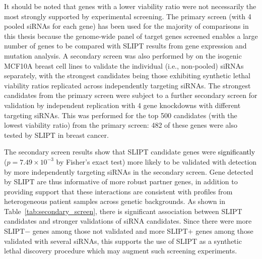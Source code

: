 It should be noted that genes with a lower viability ratio were not necessarily the most strongly supported by experimental screening. The primary screen (with 4 pooled \glspl{siRNA} for each gene) has been used for the majority of comparisons in this thesis because the \gls{genome}-wide panel of target genes screened enables a large number of genes to be compared with \gls{SLIPT} results from \gls{gene expression} and  \gls{mutation} analysis. A secondary screen was also performed by \citet{Telford2015} on the isogenic MCF10A breast cell lines to validate the individual (i.e., non-pooled) \glspl{siRNA} separately, with the strongest candidates being those exhibiting \gls{synthetic lethal} viability ratios replicated across independently targeting \glspl{siRNA}. The strongest candidates from the primary screen were subject to a further secondary screen for validation by independent replication with 4 gene knockdowns with different targeting \glspl{siRNA}. This was performed for the top 500 candidates (with the lowest viability ratio) from the primary screen: 482 of these genes were also tested by \gls{SLIPT} in breast cancer.%

The secondary screen results show that \gls{SLIPT} candidate genes were \textcolor{black}{significantly} ($p=7.49 \times 10^{-3}$ by Fisher's exact test) more  likely to be validated with detection by more independently targeting \glspl{siRNA} in the secondary screen. Gene detected by \gls{SLIPT} are thus informative of more robust partner genes, in addition to providing support that these interactions are consistent with  profiles from heterogeneous patient samples across genetic backgrounds. As shown in Table~\ref{tab:secondary_screen}, there is significant %
association between \gls{SLIPT} candidates and stronger validations of \gls{siRNA} candidates. Since there were more SLIPT$-$ genes among those not validated and more SLIPT$+$ genes among those validated with several \glspl{siRNA}, this supports the use of SLIPT as a \gls{synthetic lethal} discovery procedure which may augment such screening experiments.

